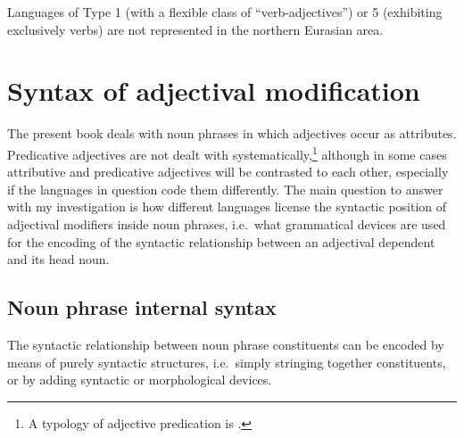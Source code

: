Languages of Type 1 (with a flexible class of “verb-adjectives”) or 5 (exhibiting exclusively verbs) are not represented in the northern Eurasian area.

\section{Syntax of adjectival modification}
The present book deals with noun phrases in which adjectives occur as attributes. Predicative adjectives are not dealt with systematically,\footnote{A typology of adjective predication is \textcite{wetzer1996}.} although in some cases attributive and predicative adjectives will be contrasted to each other, especially if the languages in question code them differently. The main question to answer with my investigation is how different languages license the syntactic position of adjectival modifiers inside noun phrases, i.e.~what grammatical devices are used for the encoding of the syntactic relationship between an adjectival dependent and its head noun. 

\subsection{Noun phrase internal syntax}
The syntactic relationship between noun phrase constituents can be encoded by means of purely syntactic structures, i.e.~simply stringing together constituents, or by adding syntactic or morphological devices. 

